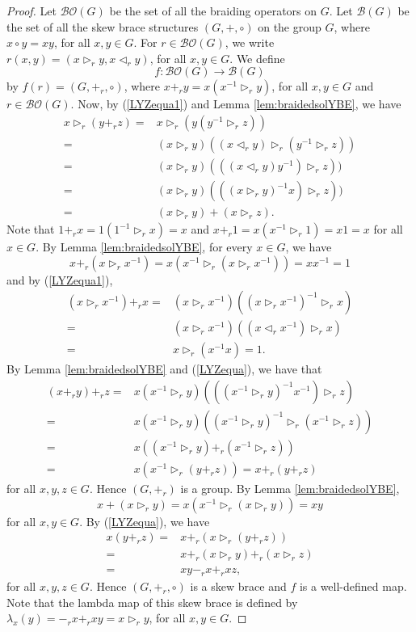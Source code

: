 \begin{proof}
    Let $\mathcal{BO}(G)$ be the set of all the braiding operators on $G$. Let $\mathcal{B}(G)$ be the set of all the skew brace structures $(G,+,\circ)$ on the group $G$, where $x\circ y=xy$, for all $x,y\in G$. For $r\in \mathcal{BO}(G)$, we write $r(x,y)=(x\rhd_r y,x\lhd_r y)$, for all $x,y\in G$. We define
    \[ f\colon \mathcal{BO}(G)\rightarrow \mathcal{B}(G)\]
    by $f(r)=(G,+_r,\circ)$, where $x+_r y=x(x^{-1}\rhd_r y)$, for all $x,y\in G$ and $r\in \mathcal{BO}(G)$. Now, by (\ref{LYZequa1}) and Lemma \ref{lem:braidedsolYBE}, we have
    \begin{align}\label{LYZequa}
        x\rhd_r (y+_r z)=&x\rhd_r(y(y^{-1}\rhd_r z))\nonumber\\
        =&(x\rhd_r y)((x\lhd_r y)\rhd_r (y^{-1}\rhd_r z))\nonumber\\
        =&(x\rhd_r y)(((x\lhd_r y)y^{-1})\rhd_r z))\nonumber\\
        =&(x\rhd_r y)(((x\rhd_r y)^{-1}x)\rhd_r z))\nonumber\\
        =&(x\rhd_r y)+(x\rhd_r z).
    \end{align}
    Note that $1+_r x=1(1^{-1}\rhd_r x)=x$ and
    $x+_r 1=x(x^{-1}\rhd_r 1)=x1=x$  for all $x\in G$. By Lemma \ref{lem:braidedsolYBE},  for every $x\in G$, we have
    \[x+_r (x\rhd_r x^{-1})=x(x^{-1}\rhd_r(x\rhd_r x^{-1}))=xx^{-1}=1\]
and by (\ref{LYZequa1}),
\begin{align*}
    (x\rhd_r x^{-1})+_r x=&(x\rhd_r x^{-1})((x\rhd_r x^{-1})^{-1}\rhd_r x)\\
    =&(x\rhd_r x^{-1})((x\lhd_r x^{-1})\rhd_r x)\\
    =&x\rhd_r(x^{-1}x)=1.
\end{align*}
By Lemma \ref{lem:braidedsolYBE} and (\ref{LYZequa}), we have that
\begin{align*}
    (x+_r y)+_r z=&x(x^{-1}\rhd_r y)(((x^{-1}\rhd_r y)^{-1}x^{-1})\rhd_r z)\\
    =&x(x^{-1}\rhd_r y)((x^{-1}\rhd_r y)^{-1}\rhd_r (x^{-1}\rhd_r z))\\
    =&x((x^{-1}\rhd_r y)+_r(x^{-1}\rhd_r z))\\
    =&x(x^{-1}\rhd_r(y+_r z))=x+_r (y+_r z)
\end{align*}
for all $x,y,z\in G$. Hence $(G,+_r)$ is a group. By Lemma \ref{lem:braidedsolYBE}, 
\[x+(x\rhd_r y)=x(x^{-1}\rhd_r(x\rhd_r y))=xy\]
for all $x,y\in G$.
By (\ref{LYZequa}), we have
\begin{align*}
    x(y+_r z)=&x+_r(x\rhd_r (y+_r z))\\
    =&x+_r (x\rhd_r y)+_r(x\rhd_r z)\\
    =&xy-_r x+_r xz,
\end{align*}
for all $x,y,z\in G$. Hence $(G,+_r,\circ)$ is a skew brace and $f$ is a well-defined map. Note that the lambda map of this skew brace is defined by
$\lambda_x(y)=-_r x+_r xy=x\rhd_r y$, for all $x,y\in G$.


\end{proof}
